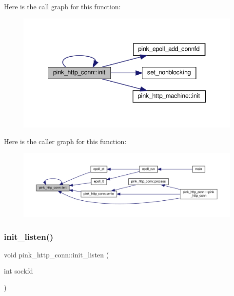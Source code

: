 Here is the call graph for this function\+:\nopagebreak
\begin{figure}[H]
\begin{center}
\leavevmode
\includegraphics[width=334pt]{classpink__http__conn_abff27697496d209cdc7375f99117f018_cgraph}
\end{center}
\end{figure}
Here is the caller graph for this function\+:\nopagebreak
\begin{figure}[H]
\begin{center}
\leavevmode
\includegraphics[width=350pt]{classpink__http__conn_abff27697496d209cdc7375f99117f018_icgraph}
\end{center}
\end{figure}
\mbox{\label{classpink__http__conn_a14ed30d2643f52ec95c45b11b13b2411}} 
\subsubsection{\texorpdfstring{init\+\_\+listen()}{init\_listen()}}
{\footnotesize\ttfamily void pink\+\_\+http\+\_\+conn\+::init\+\_\+listen (\begin{DoxyParamCaption}\item[{int}]{sockfd }\end{DoxyParamCaption})}



